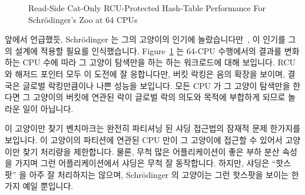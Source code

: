 \begin{figure}[tb]
\centering
{}
\caption{Read-Side Cat-Only RCU-Protected Hash-Table Performance For Schr\"odinger's Zoo at 64 CPUs}
\label{fig:datastruct:Read-Side Cat-Only RCU-Protected Hash-Table Performance For Schroedinger's Zoo at 64 CPUs}
\end{figure}

앞에서 언급했듯, Schr\"odinger 는 그의 고양이의 인기에
놀랐습니다만~\cite{ErwinSchroedinger1935Cat}, 이 인기를 그의 설계에 적용할
필요를 인식했습니다.
Figure~\ref{fig:datastruct:Read-Side Cat-Only RCU-Protected Hash-Table Performance For Schroedinger's Zoo at 64 CPUs}
는 64-CPU 수행에서의 결과를 변화하는 CPU 수에 따라 그 고양이 탐색만을 하는 하는
워크로드에 대해 보입니다.
RCU 와 해저드 포인터 모두 이 도전에 잘 응합니다만, 버킷 락킹은 음의 확장을
보이며, 결국은 글로벌 락킹만큼이나 나쁜 성능을 보입니다.
모든 CPU 가 그 고양이 탐색만을 한다면 그 고양이의 버킷에 연관된 락이 글로벌
락의 의도와 목적에 부합하게 되므로 놀라운 일이 아닙니다.

이 고양이만 찾기 벤치마크는 완전히 파티셔닝 된 샤딩 접근법의 잠재적 문제
한가지를 보입니다.
이 고양이의 파티션에 연관된 CPU 만이 그 고양이에 접근할 수 있어서 고양이만 찾기
처리량을 제한합니다.
물론, 무척 많은 어플리케이션이 좋은 부하 분산 속성을 가지며 그런
어플리케이션에서 샤딩은 무척 잘 동작합니다.
하지만, 샤딩은 ``핫스팟'' 을 아주 잘 처리하지는 않으며, Schr\"odinger 의
고양이는 그런 핫스팟을 보이는 한가지 예일 뿐입니다.

